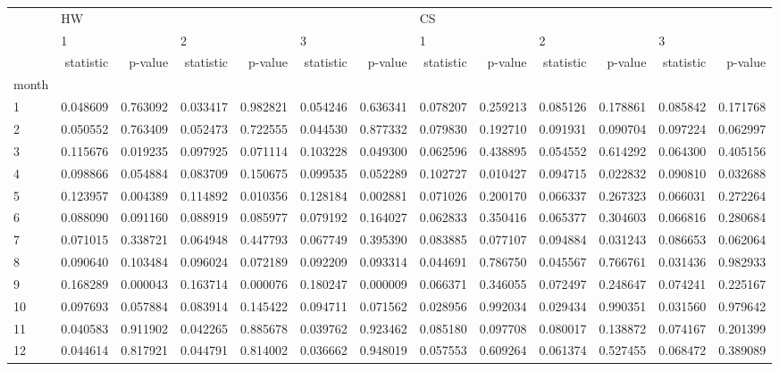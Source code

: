\begin{tabular}{lrrrrrrrrrrrr}
\toprule
{} & \multicolumn{6}{l}{HW} & \multicolumn{6}{l}{CS} \\
{} & \multicolumn{2}{l}{1} & \multicolumn{2}{l}{2} & \multicolumn{2}{l}{3} & \multicolumn{2}{l}{1} & \multicolumn{2}{l}{2} & \multicolumn{2}{l}{3} \\
{} & statistic &   p-value & statistic &   p-value & statistic &   p-value & statistic &   p-value & statistic &   p-value & statistic &   p-value \\
month &           &           &           &           &           &           &           &           &           &           &           &           \\
\midrule
1     &  0.048609 &  0.763092 &  0.033417 &  0.982821 &  0.054246 &  0.636341 &  0.078207 &  0.259213 &  0.085126 &  0.178861 &  0.085842 &  0.171768 \\
2     &  0.050552 &  0.763409 &  0.052473 &  0.722555 &  0.044530 &  0.877332 &  0.079830 &  0.192710 &  0.091931 &  0.090704 &  0.097224 &  0.062997 \\
3     &  0.115676 &  0.019235 &  0.097925 &  0.071114 &  0.103228 &  0.049300 &  0.062596 &  0.438895 &  0.054552 &  0.614292 &  0.064300 &  0.405156 \\
4     &  0.098866 &  0.054884 &  0.083709 &  0.150675 &  0.099535 &  0.052289 &  0.102727 &  0.010427 &  0.094715 &  0.022832 &  0.090810 &  0.032688 \\
5     &  0.123957 &  0.004389 &  0.114892 &  0.010356 &  0.128184 &  0.002881 &  0.071026 &  0.200170 &  0.066337 &  0.267323 &  0.066031 &  0.272264 \\
6     &  0.088090 &  0.091160 &  0.088919 &  0.085977 &  0.079192 &  0.164027 &  0.062833 &  0.350416 &  0.065377 &  0.304603 &  0.066816 &  0.280684 \\
7     &  0.071015 &  0.338721 &  0.064948 &  0.447793 &  0.067749 &  0.395390 &  0.083885 &  0.077107 &  0.094884 &  0.031243 &  0.086653 &  0.062064 \\
8     &  0.090640 &  0.103484 &  0.096024 &  0.072189 &  0.092209 &  0.093314 &  0.044691 &  0.786750 &  0.045567 &  0.766761 &  0.031436 &  0.982933 \\
9     &  0.168289 &  0.000043 &  0.163714 &  0.000076 &  0.180247 &  0.000009 &  0.066371 &  0.346055 &  0.072497 &  0.248647 &  0.074241 &  0.225167 \\
10    &  0.097693 &  0.057884 &  0.083914 &  0.145422 &  0.094711 &  0.071562 &  0.028956 &  0.992034 &  0.029434 &  0.990351 &  0.031560 &  0.979642 \\
11    &  0.040583 &  0.911902 &  0.042265 &  0.885678 &  0.039762 &  0.923462 &  0.085180 &  0.097708 &  0.080017 &  0.138872 &  0.074167 &  0.201399 \\
12    &  0.044614 &  0.817921 &  0.044791 &  0.814002 &  0.036662 &  0.948019 &  0.057553 &  0.609264 &  0.061374 &  0.527455 &  0.068472 &  0.389089 \\
\bottomrule
\end{tabular}
